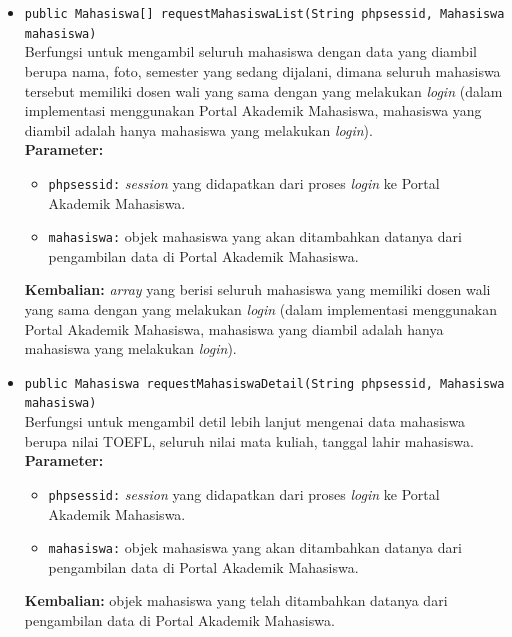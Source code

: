 \begin{enumerate}
\begin{itemize}
		\item \texttt{public Mahasiswa[] requestMahasiswaList(String phpsessid, Mahasiswa\\ mahasiswa)}\\
		\label{requestMahasiswaList}
	    Berfungsi untuk mengambil seluruh mahasiswa dengan data yang diambil berupa nama, foto, semester yang sedang dijalani, dimana seluruh mahasiswa tersebut memiliki dosen wali yang sama dengan yang melakukan \textit{login} (dalam implementasi menggunakan Portal Akademik Mahasiswa, mahasiswa yang diambil adalah hanya mahasiswa yang melakukan \textit{login}).\\
		\textbf{Parameter:}
			\begin{itemize}
				\item \texttt{phpsessid:} \textit{session} yang didapatkan dari proses \textit{login} ke Portal Akademik Mahasiswa.
				\item \texttt{mahasiswa:} objek mahasiswa yang akan ditambahkan datanya dari pengambilan data di Portal Akademik Mahasiswa.
			\end{itemize}
		\textbf{Kembalian:} \textit{array} yang berisi seluruh mahasiswa yang memiliki dosen wali yang sama dengan yang melakukan \textit{login} (dalam implementasi menggunakan Portal Akademik Mahasiswa, mahasiswa yang diambil adalah hanya mahasiswa yang melakukan \textit{login}).
		
		\item \texttt{public Mahasiswa requestMahasiswaDetail(String phpsessid, Mahasiswa\\ mahasiswa)}\\
		\label{requestMahasiswaDetail}
	    Berfungsi untuk mengambil detil lebih lanjut mengenai data mahasiswa berupa nilai TOEFL, seluruh nilai mata kuliah, tanggal lahir mahasiswa.\\
		\textbf{Parameter:}
			\begin{itemize}
				\item \texttt{phpsessid:} \textit{session} yang didapatkan dari proses \textit{login} ke Portal Akademik Mahasiswa.
				\item \texttt{mahasiswa:} objek mahasiswa yang akan ditambahkan datanya dari pengambilan data di Portal Akademik Mahasiswa.
			\end{itemize}
		\textbf{Kembalian:} objek mahasiswa yang telah ditambahkan datanya dari pengambilan data di Portal Akademik Mahasiswa.
	\end{itemize}
	

\end{enumerate}
